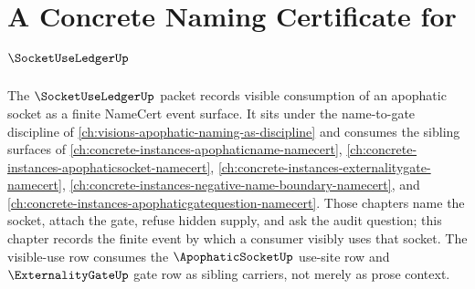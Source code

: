 \chapter{A Concrete Naming Certificate for $\SocketUseLedgerUp$}
\label{ch:concrete-instances-socket-use-ledger-namecert}

The $\SocketUseLedgerUp$ packet records visible consumption of an apophatic socket as a finite NameCert event surface. It sits under the name-to-gate discipline of \autoref{ch:visions-apophatic-naming-as-discipline} and consumes the sibling surfaces of \autoref{ch:concrete-instances-apophaticname-namecert}, \autoref{ch:concrete-instances-apophaticsocket-namecert}, \autoref{ch:concrete-instances-externalitygate-namecert}, \autoref{ch:concrete-instances-negative-name-boundary-namecert}, and \autoref{ch:concrete-instances-apophaticgatequestion-namecert}. Those chapters name the socket, attach the gate, refuse hidden supply, and ask the audit question; this chapter records the finite event by which a consumer visibly uses that socket. The visible-use row consumes the $\ApophaticSocketUp$ use-site row and $\ExternalityGateUp$ gate row as sibling carriers, not merely as prose context.

